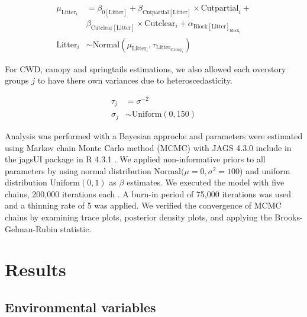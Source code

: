 \begin{align}
  \mu_{\text{Litter}_i} &= 
  \beta_{0[\text{Litter}]} + \beta_{\text{Cutpartial}[\text{Litter}]} \times \text{Cutpartial}_{i} + \nonumber\\
  & \beta_{\text{Cutclear}[\text{Litter}]} \times \text{Cutclear}_{i} + \alpha_{\text{Block}[\text{Litter}]_{\text{block}_i}} \\
  \text{Litter}_{i} &\sim 
  \text{Normal} (\mu_{\text{Litter}_i}, \tau_{\text{Litter}_{\text{Group}_i}}) \nonumber 
\end{align}

\vspace{0.5cm}

For CWD, canopy and springtails estimations, we also allowed each overstory groups $j$ to have there own variances due to heteroscedasticity.

\begin{align}
  \tau_j &= \sigma^{-2} \\
  \sigma_j &\sim \text{Uniform}(0,150) \nonumber
\end{align}


Analysis was performed with a Bayesian approche and parameters were estimated using Markov chain Monte Carlo method (MCMC) with JAGS 4.3.0 include in the jagsUI package in R 4.3.1 \citep{lunnBUGSProjectEvolution2009,kellnerJagsUIWrapperRjags2024,rcoreteamLanguageEnvironmentStatistical2020}.
We applied non-informative priors to all parameters by using normal distribution $\text{Normal}(\mu = 0, \sigma^2 = 100$) and uniform distribution $\text{Uniform}(0,1)$ as $\beta$ estimates. 
We executed the model with five chains, 200,000 iterations each \citep{gelmanUnderstandingPredictiveInformation2014}. A burn-in period of 75,000 iterations was used and a thinning rate of 5 was applied. 
We verified the convergence of MCMC chains by examining trace plots, posterior density plots, and applying the Brooks-Gelman-Rubin statistic.

\clearpage



\section*{Results}
\label{sec:results1}

\subsection*{Environmental variables}
\label{subsec:ResEnv}


